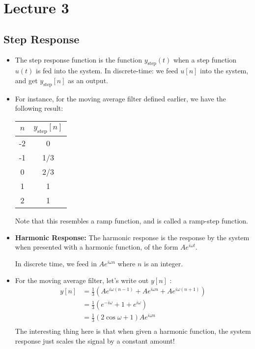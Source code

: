 \section{Lecture 3}
\subsection{Step Response}
\begin{itemize}
	\item The step response function is the function \( y_{\text{step}}(t) \) when a step function 
		\( u(t) \) is fed into the system. In discrete-time: we feed \( u[n] \) into the system, and get 
		\( y_{\text{step}}[n] \) as an output.
	\item For instance, for the moving average filter defined earlier, we have the following result:
		\begin{center}
			\begin{tabular}{c|c}
				\( n \) &  \( y_{\text{step}}[n] \)\\
				\hline 
				-2 & 0\\
				-1 & 1/3\\
				0 & 2/3\\
				1 & 1\\
				2 & 1
			\end{tabular}
		\end{center}
		Note that this resembles a ramp function, and is called a ramp-step function.
	\item \textbf{Harmonic Response:} The harmonic response is the response by the system when presented with 
		a harmonic function, of the form \( Ae^{i \omega t}\). 

		In discrete time, we feed in \( Ae^{i \omega n} \) where \( n \) is an integer. 
	\item For the moving average filter, let's write out \( y[n] \) :
		\begin{align*}
			y[n] &= \frac{1}{3}\left(Ae^{i \omega (n - 1)} + Ae^{i \omega n} + Ae^{i \omega (n + 1)}\right)\\
			&= \frac{1}{3}\left( e^{-i \omega} + 1 + e^{i \omega} \right)  \\
			&= \frac{1}{3}(2 \cos \omega + 1) Ae^{i \omega n} \\
		\end{align*}
		The interesting thing here is that when given a harmonic function, the system response just scales the signal 
		by a constant amount!
\end{itemize}
